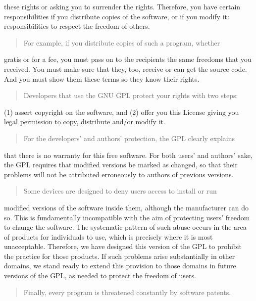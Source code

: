 \documentclass[letterpaper,10pt,english]{sphinxmanual}
\begin{document}
these rights or asking you to surrender the rights.  Therefore, you have
certain responsibilities if you distribute copies of the software, or if
you modify it: responsibilities to respect the freedom of others.
\begin{quote}

For example, if you distribute copies of such a program, whether
\end{quote}

gratis or for a fee, you must pass on to the recipients the same
freedoms that you received.  You must make sure that they, too, receive
or can get the source code.  And you must show them these terms so they
know their rights.
\begin{quote}

Developers that use the GNU GPL protect your rights with two steps:
\end{quote}

(1) assert copyright on the software, and (2) offer you this License
giving you legal permission to copy, distribute and/or modify it.
\begin{quote}

For the developers’ and authors’ protection, the GPL clearly explains
\end{quote}

that there is no warranty for this free software.  For both users’ and
authors’ sake, the GPL requires that modified versions be marked as
changed, so that their problems will not be attributed erroneously to
authors of previous versions.
\begin{quote}

Some devices are designed to deny users access to install or run
\end{quote}

modified versions of the software inside them, although the manufacturer
can do so.  This is fundamentally incompatible with the aim of
protecting users’ freedom to change the software.  The systematic
pattern of such abuse occurs in the area of products for individuals to
use, which is precisely where it is most unacceptable.  Therefore, we
have designed this version of the GPL to prohibit the practice for those
products.  If such problems arise substantially in other domains, we
stand ready to extend this provision to those domains in future versions
of the GPL, as needed to protect the freedom of users.
\begin{quote}

Finally, every program is threatened constantly by software patents.
\end{quote}
\end{document}
